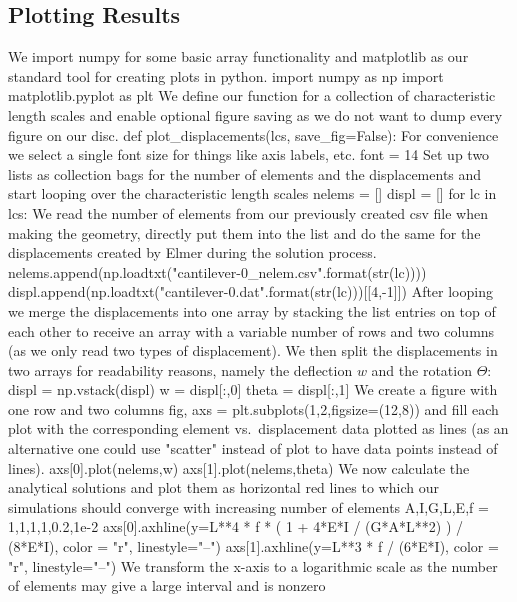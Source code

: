 \subsection*{Plotting Results}
We import numpy for some basic array functionality and matplotlib as our standard tool for creating plots in python. 
\ttbegin 
import numpy as np
import matplotlib.pyplot as plt
\ttend 
We define our function for a collection of characteristic length scales and enable optional figure saving as we do not want to dump every figure on our disc.
\ttbegin
def plot\_displacements(lcs,
                       save_fig=False):
\ttend 
For convenience we select a single font size for things like axis labels, etc.
\ttbegin
    font = 14
\ttend 
Set up two lists as collection bags for the number of elements and the displacements and start looping over the characteristic length scales 
\ttbegin
    nelems = []
    displ = []
    for lc in lcs:
\ttend 
We read the number of elements from our previously created csv file when making the geometry, directly put them into the list and do the same for the displacements created by Elmer during the solution process.
\ttbegin
        nelems.append(np.loadtxt("cantilever-{0}_nelem.csv".format(str(lc))))
        displ.append(np.loadtxt("cantilever-{0}.dat".format(str(lc)))[[4,-1]])
\ttend 
After looping we merge the displacements into one array by stacking the list entries on top of each other to receive an array with a variable number of rows and two columns (as we only read two types of displacement). We then split the displacements in two arrays for readability reasons, namely the deflection \(w\) and the rotation \(\Theta\):
\ttbegin
    displ = np.vstack(displ)
    w = displ[:,0]
    theta = displ[:,1]
\ttend 
We create a figure with one row and two columns
\ttbegin 
    fig, axs = plt.subplots(1,2,figsize=(12,8))
\ttend 
and fill each plot with the corresponding element vs.\ displacement data plotted as lines (as an alternative one could use "scatter" instead of plot to have data points instead of lines). 
\ttbegin
    axs[0].plot(nelems,w)
    axs[1].plot(nelems,theta)
\ttend 
We now calculate the analytical solutions and plot them as horizontal red lines to which our simulations should converge with increasing number of elements
\ttbegin
    A,I,G,L,E,f = 1,1,1,1,0.2,1e-2
    axs[0].axhline(y=L**4 * f * ( 1 + 4*E*I / (G*A*L**2) ) / (8*E*I), 
                   color = "r", linestyle="--")
    axs[1].axhline(y=L**3 * f / (6*E*I),
                   color = "r", linestyle="--")
\ttend 
We transform the x-axis to a logarithmic scale as the number of elements may give a large interval and is nonzero
